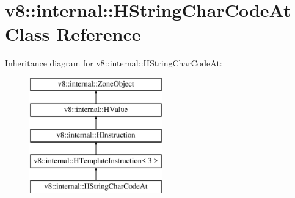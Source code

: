 \hypertarget{classv8_1_1internal_1_1_h_string_char_code_at}{}\section{v8\+:\+:internal\+:\+:H\+String\+Char\+Code\+At Class Reference}
\label{classv8_1_1internal_1_1_h_string_char_code_at}
Inheritance diagram for v8\+:\+:internal\+:\+:H\+String\+Char\+Code\+At\+:\begin{figure}[H]
\begin{center}
\leavevmode
\includegraphics[height=5.000000cm]{classv8_1_1internal_1_1_h_string_char_code_at}
\end{center}
\end{figure}
